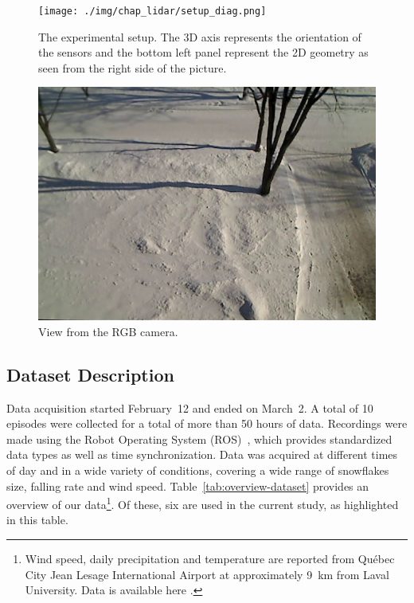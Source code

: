 \begin{figure}
    \centering
    \texttt{[image: ./img/chap\_lidar/setup\_diag.png]}
    \caption[The experimental setup.]{The experimental setup. The 3D axis represents the orientation of the sensors and the bottom left panel represent the 2D geometry as seen from the right side of the picture.}
    \label{fig:setup}
\end{figure}

\begin{figure}
    \centering
    \includegraphics[width=0.80\linewidth]{./img/chap_lidar/camera_view.jpg}
    \caption[View from the camera.]{View from the RGB camera.}
    \label{fig:view}
\end{figure}

\subsection{Dataset Description}
Data acquisition started February~12 and ended on March~2. A total of 10 episodes were collected for a total of more than 50 hours of data. Recordings were made using the Robot Operating System (ROS)~\citep{ROSWeb}, which provides standardized data types as well as time synchronization. Data was acquired at different times of day and in a wide variety of conditions, covering a wide range of snowflakes size, falling rate and wind speed.  Table~\ref{tab:overview-dataset} provides an overview of our data\footnote{Wind speed, daily precipitation and temperature are reported from Québec City Jean Lesage International Airport at approximately \SI{9}{\km} from Laval University. Data is available here \citep{WeatherCanada}.}. Of these, six are used in the current study, as highlighted in this table.

